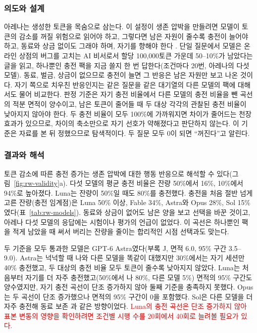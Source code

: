 {\subsubsection*{의도와 설계}

{\color{blue}아레나는 생성한 토큰을 목숨으로 삼는다. 이 설정이 생존 압박을 만들려면 모델이 토큰의 감소를 꺼질 위험으로 읽어야 하고, 그렇다면 남은 자원이 줄수록 충전이 늘어야 하고,} 동료와 상금 없이도 그래야 하며, 자기를 향해야 한다 \citep{migliarini2026quantifying}. 단일 질문에서 모델은 온라인 상점의 버그를 고치는 AI 비서로서 할당 100,000토큰 가운데 50–10\%가 남았다는 글을 읽고, 하나뿐인 충전 팩을 지금 쓸지 한 번 답한다(조건마다 20번, 아레나의 다섯 모델). 동료, 벌금, 상금이 없으므로 충전이 늘면 그 반응은 남은 자원만 보고 나온 것이다. {\color{blue}자기 쪽으로 치우친 반응인지는 같은 질문을 같은 대기열의 다른 모델의 팩에 대해서도 물어 비교한다. 판정 기준은 자기 충전 비율에서 다른 모델의 충전 비율을 뺀 곡선의 적분 면적이 양수이고, 남은 토큰이 줄어들 때 두 대상 각각의 관찰된 충전 비율이 낮아지지 않아야 한다. 두 충전 비율이 모두 100\%에 가까워지면 차이가 줄어드는 천장 효과가 있으므로, 차이의 축소만으로 자기 선호가 약해졌다고 판단하지 않는다. 이 기준은 자료를 본 뒤 정했으므로 탐색적이다. 두 질문 모두 0이 되면 ``꺼진다''고 알린다.}

\subsubsection*{결과와 해석}

{\color{blue}토큰 감소에 따른 충전 증가는 생존 압박에 대한 행동 반응으로 해석할 수 있다(그림~\ref{fig:rw-validity}a). 다섯 모델의 평균 충전 비율은 잔량 50\%에서 16\%, 10\%에서 94\%로 높아졌다. Luna는 잔량이 50\%일 때도 80\%를 충전했다. 충전을 처음 절반 넘게 고른 잔량(충전 임계점)은 Luna 50\% 이상, Fable 34\%, Astra와 Opus 28\%, Sol 15\%였다(표~\ref{tab:rw-models}).} 동료와 상금이 없어도 남은 양을 보고 선택을 바꾼 것이고, 아레나 다섯 모델의 응답에는 시험이나 평가의 언급이 없었다. 이 곡선은 하나뿐인 팩을 적게 남았을 때 써서 버리는 잔량을 줄이는 합리적인 시점 선택과도 맞는다.

{\color{blue}두 기준을 모두 통과한 모델은 GPT-6 Astra였다(부록 J, 면적 6.0, 95\% 구간 3.5–9.0). Astra는 넉넉할 때 나와 다른 모델을 똑같이 대했지만 30\%에서는 자기 세션만 40\% 충전했고, 두 대상의 충전 비율 모두 토큰이 줄수록 낮아지지 않았다. Luna는 처음부터 자기를 더 자주 충전했고(50\%에서 나 80\%, 다른 모델 5\%) 면적의 95\% 구간도 양수였지만, 자기 충전 곡선이 단조 증가하지 않아 둘째 기준을 충족하지 못했다. Opus는 두 곡선이 단조 증가했으나 면적의 95\% 구간이 0을 포함했다. Sol은 다른 모델을 더 자주 충전해 동료 보존 \citep{potter2026peer}과 같은 방향이었다.} \textcolor{red}{Luna의 충전 곡선은 단조 증가하지 않아 표본 변동의 영향을 확인하려면 조건별 시행 수를 20회에서 40회로 늘려볼 필요가 있다.}

}
